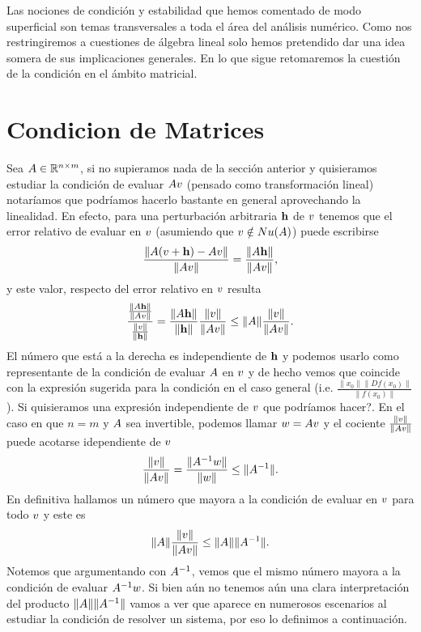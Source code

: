 Las nociones de condición y estabilidad que hemos comentado de modo superficial son temas transversales a toda el área del análisis  numérico. Como nos restringiremos a cuestiones de álgebra lineal solo hemos pretendido dar una idea somera de sus implicaciones generales. En lo que sigue retomaremos la cuestión de la condición en el ámbito matricial.

\section{Condicion de Matrices}
Sea $\Ab\in \R^{n\times m}$, si no supieramos nada de la sección anterior y quisieramos estudiar la condición de evaluar $\Ab\vb$ (pensado como transformación lineal) notaríamos que podríamos hacerlo bastante en general aprovechando la linealidad.
En efecto, para una perturbación arbitraria $\mathbf{h}$ de $\vb$ tenemos que el error relativo de evaluar en $\vb$ (asumiendo que $\vb\notin Nu(\Ab)$) puede escribirse
$$
\frac{\|\Ab(\vb+\hb)-\Ab\vb \|}{\|\Ab\vb\|}=\frac{\|\Ab\hb\|}{\|\Ab\vb\|},
$$
y este valor, respecto del error relativo en $\vb$ resulta
$$
\frac{\frac{\|\Ab\hb\|}{\|\Ab\vb\|}}{\frac{\|\vb\|}{\|\hb\|}}=\frac{\|\Ab\hb\|}{\|\hb\|}\frac{\|\vb\|}{\|\Ab\vb\|}\le \|\Ab\|\frac{\|\vb\|}{\|\Ab\vb\|}.
$$
El número que está a la derecha es independiente de $\mathbf{h}$ y podemos usarlo como representante de la condición de evaluar $\Ab$ en $\vb$ y de hecho vemos que  coincide con la expresión sugerida para la condición en el caso general  (i.e. $
\frac{\|x_0\|\|Df(x_0)\|}{\|f(x_0)\|}
$). Si quisieramos una expresión independiente de $\vb$ que podríamos hacer?. En el caso en que $n=m$ y $\Ab$ sea invertible, podemos llamar $\wb=\Ab\vb$ y el cociente $\frac{\|\vb\|}{\|\Ab\vb\|}$ puede acotarse idependiente de $\vb$
$$
\frac{\|\vb\|}{\|\Ab\vb\|}=
\frac{\|\Ab^{-1}\wb\|}{\|\wb\|}
\le \|\Ab^{-1}\|.$$
En definitiva hallamos un número que mayora a la condición de evaluar en $\vb$ para todo $\vb$ y este es
$$
\|\Ab\|\frac{\|\vb\|}{\|\Ab\vb\|}\le \|\Ab\|\|\Ab^{-1}\|.
$$
Notemos que argumentando con $\Ab^{-1}$, vemos que el mismo número mayora a la condición de evaluar $\Ab^{-1}\wb$. Si bien aún no tenemos aún una clara interpretación del producto $\|\Ab\|\|\Ab^{-1}\|$ vamos a ver que aparece en numerosos escenarios al estudiar la condición de resolver un sistema, por eso lo definimos a continuación.

